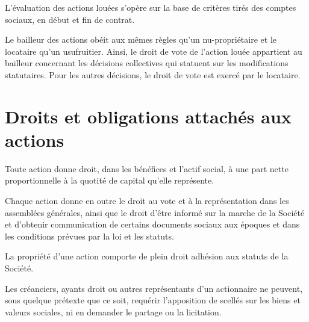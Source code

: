\documentclass[a4paper,12pt]{report}
\begin{document}
L'évaluation des actions louées s'opère sur la base de critères tirés des comptes sociaux, en début et fin de contrat.

Le bailleur des actions obéit aux mêmes règles qu'un nu-propriétaire et le locataire qu'un usufruitier. 
Ainsi, le droit de vote de l'action louée appartient au bailleur concernant les décisions collectives qui statuent sur les modifications statutaires. 
Pour les autres décisions, le droit de vote est exercé par le locataire.

\section{Droits et obligations attachés aux actions}
Toute action donne droit, dans les bénéfices et l'actif social, à une part nette proportionnelle à la quotité de capital qu'elle représente.

Chaque action donne en outre le droit au vote et à la représentation dans les assemblées générales, 
ainsi que le droit d'être informé sur la marche de la Société et d'obtenir communication de certains documents sociaux aux époques 
et dans les conditions prévues par la loi et les statuts.

La propriété d'une action comporte de plein droit adhésion aux statuts de la Société.

Les créanciers, ayants droit ou autres représentants d'un actionnaire ne peuvent, sous quelque prétexte que ce soit, 
requérir l'apposition de scellés sur les biens et valeurs sociales, ni en demander le partage ou la licitation.
\end{document}
